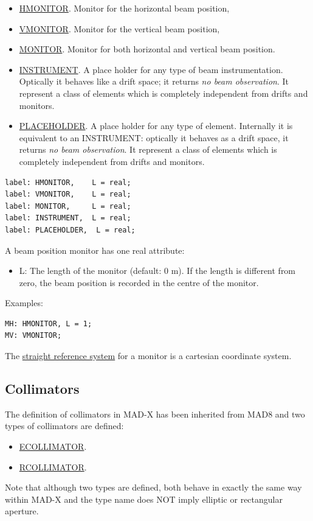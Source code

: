 \begin{itemize}
   \item \href{hmon}{HMONITOR}. Monitor for the horizontal beam position, 
   \item \href{vmon}{VMONITOR}. Monitor for the vertical beam position, 
   \item \href{mon}{MONITOR}. Monitor for both horizontal and vertical beam position. 
   \item \href{inst}{INSTRUMENT}. A place holder for any type of beam
     instrumentation. Optically it behaves like a drift space; it
     returns \emph{no beam observation}. It represent a class of
     elements which is completely independent from drifts and monitors.  
   \item \href{plac}{PLACEHOLDER}. A place holder for any type of
     element. Internally it is equivalent to an INSTRUMENT: optically it
     behaves as a drift space, it returns \emph{no beam observation}. It
     represent a class of elements which is completely independent from
     drifts and monitors. 
\end{itemize}

\begin{verbatim}
label: HMONITOR,    L = real;
label: VMONITOR,    L = real;
label: MONITOR,     L = real;
label: INSTRUMENT,  L = real;
label: PLACEHOLDER,  L = real;
\end{verbatim} 

A beam position monitor has one real attribute: 
\begin{itemize}
   \item L: The length of the monitor (default: 0 m). If the length is
     different from zero, the beam position is recorded in the centre of
     the monitor.  
\end{itemize} 

Examples: 
\begin{verbatim}
MH: HMONITOR, L = 1;
MV: VMONITOR;
\end{verbatim} 

The \href{local_system.html#straight}{straight reference system} for a
monitor is a cartesian coordinate system.  


%
\subsection{Collimators}
 
The definition of collimators in MAD-X has been inherited from MAD8 and two types of collimators are defined: 
\begin{itemize}
   \item \href{ecol}{ECOLLIMATOR}. 
   \item \href{rcol}{RCOLLIMATOR}. 
\end{itemize}  
Note that although two types are defined, both behave in exactly the
same way within MAD-X and the type name does NOT imply elliptic or
rectangular aperture.    

